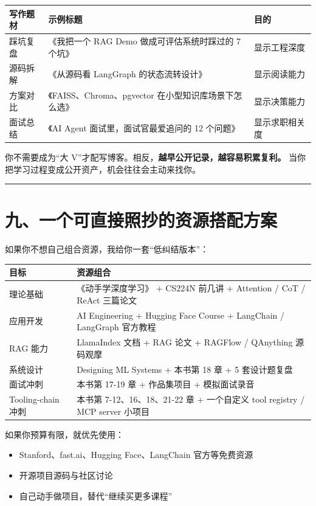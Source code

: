 \begingroup
\scriptsize
\setlength{\tabcolsep}{3pt}
\begin{longtable}{|p{}|p{}|p{}|}
\hline
写作题材 & 示例标题 & 目的 \\ \hline
踩坑复盘 & 《我把一个 RAG Demo 做成可评估系统时踩过的 7 个坑》 & 显示工程深度 \\ \hline
源码拆解 & 《从源码看 LangGraph 的状态流转设计》 & 显示阅读能力 \\ \hline
方案对比 & 《FAISS、Chroma、pgvector 在小型知识库场景下怎么选》 & 显示决策能力 \\ \hline
面试总结 & 《AI Agent 面试里，面试官最爱追问的 12 个问题》 & 显示求职相关度 \\ \hline
\end{longtable}
\endgroup

你不需要成为``大 V''才配写博客。相反，\textbf{越早公开记录，越容易积累复利。} 当你把学习过程变成公开资产，机会往往会主动来找你。


\bigskip\hrule\bigskip

\section{九、一个可直接照抄的资源搭配方案}

如果你不想自己组合资源，我给你一套``低纠结版本''：


\begingroup
\scriptsize
\setlength{\tabcolsep}{3pt}
\begin{longtable}{|p{}|p{}|}
\hline
目标 & 资源组合 \\ \hline
理论基础 & 《动手学深度学习》 + CS224N 前几讲 + Attention / CoT / ReAct 三篇论文 \\ \hline
应用开发 & AI Engineering + Hugging Face Course + LangChain / LangGraph 官方教程 \\ \hline
RAG 能力 & LlamaIndex 文档 + RAG 论文 + RAGFlow / QAnything 源码观摩 \\ \hline
系统设计 & Designing ML Systems + 本书第 18 章 + 5 套设计题复盘 \\ \hline
面试冲刺 & 本书第 17-19 章 + 作品集项目 + 模拟面试录音 \\ \hline
Tooling-chain 冲刺 & 本书第 7-12、16、18、21-22 章 + 一个自定义 tool registry / MCP server 小项目 \\ \hline
\end{longtable}
\endgroup

如果你预算有限，就优先使用：


\begin{itemize}[leftmargin=2em]
\item Stanford、fast.ai、Hugging Face、LangChain 官方等免费资源
\item 开源项目源码与社区讨论
\item 自己动手做项目，替代``继续买更多课程''
\end{itemize}


